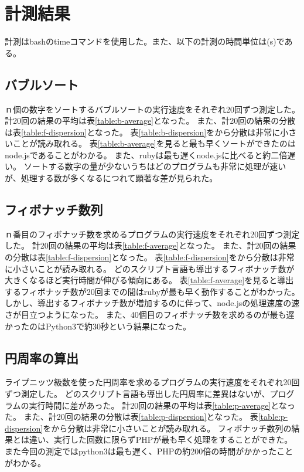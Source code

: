 \chapter{計測結果}
\label{cha:result}
計測はbashのtimeコマンドを使用した。また、以下の計測の時間単位は(s)である。
\section{バブルソート}
ｎ個の数字をソートするバブルソートの実行速度をそれぞれ20回ずつ測定した。
計20回の結果の平均は表\ref{table:b-average}となった。
また、計20回の結果の分散は表\ref{table:f-dispersion}となった。
表\ref{table:b-dispersion}をから分散は非常に小さいことが読み取れる。
表\ref{table:b-average}を見ると最も早くソートができたのはnode.jsであることがわかる。
また、rubyは最も遅くnode.jsに比べると約二倍遅い。
ソートする数字の量が少ないうちはどのプログラムも非常に処理が速いが、処理する数が多くなるにつれて顕著な差が見られた。

\section{フィボナッチ数列}
ｎ番目のフィボナッチ数を求めるプログラムの実行速度をそれぞれ20回ずつ測定した。
計20回の結果の平均は表\ref{table:f-average}となった。
また、計20回の結果の分散は表\ref{table:f-dispersion}となった。
表\ref{table:f-dispersion}をから分散は非常に小さいことが読み取れる。
どのスクリプト言語も導出するフィボナッチ数が大きくなるほど実行時間が伸びる傾向にある。
表\ref{table:f-average}を見ると導出するフィボナッチ数が20回までの間はrubyが最も早く動作することがわかった。
しかし、導出するフィボナッチ数が増加するのに伴って、node.jsの処理速度の速さが目立つようになった。
また、40個目のフィボナッチ数を求めるのが最も遅かったのはPython3で約30秒という結果になった。


\section{円周率の算出}
ライプニッツ級数を使った円周率を求めるプログラムの実行速度をそれぞれ20回ずつ測定した。
どのスクリプト言語も導出した円周率に差異はないが、プログラムの実行時間に差があった。
計20回の結果の平均は表\ref{table:p-average}となった。
また、計20回の結果の分散は表\ref{table:p-dispersion}となった。
表\ref{table:p-dispersion}をから分散は非常に小さいことが読み取れる。
フィボナッチ数列の結果とは違い、実行した回数に限らずPHPが最も早く処理をすることができた。
また今回の測定ではpython3は最も遅く、PHPの約200倍の時間がかかったことがわかる。


